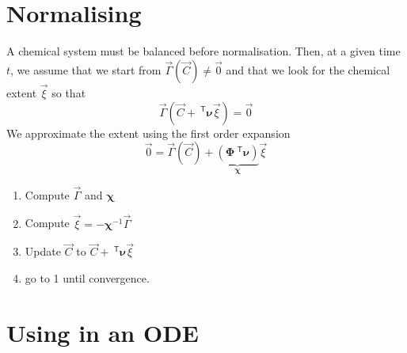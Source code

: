 \documentclass[aps]{revtex4}
\newcommand{\mymat}[1]{\bm{#1}}
\newcommand{\mytrn}[1]{~^{\mathsf{T}}{#1}}
\begin{document}
\section{Normalising}
A chemical system must be balanced before normalisation.
Then, at a given time $t$, we assume that we start from
$\vec{\Gamma}\left(\vec{C}\right)\not=\vec{0}$  and that we look for the chemical
extent $\vec{\xi}$ so that
\begin{equation}
	\vec{\Gamma}\left(\vec{C}+\mytrn{\mymat{\nu}}\vec{\xi}\right) = \vec{0}
\end{equation}
We approximate the extent using the first order expansion
\begin{equation}
	\vec{0} = \vec{\Gamma}\left(\vec{C}\right) + \underbrace{\left(\mymat{\Phi}\mytrn{\mymat{\nu}}\right)}_{\displaystyle \mymat{\chi}} 
	\vec{\xi}
\end{equation}	
\begin{enumerate}
\item Compute $\vec{\Gamma}$ and $\mymat{\chi}$
\item Compute $\vec{\xi}=-\mymat{\chi}^{-1} \vec{\Gamma}$
\item Update  $\vec{C}$ to $\vec{C}+\mytrn{\mymat{\nu}}\vec{\xi}$
\item go to 1 until convergence.
\end{enumerate}

\section{Using in an ODE}
\end{document}
